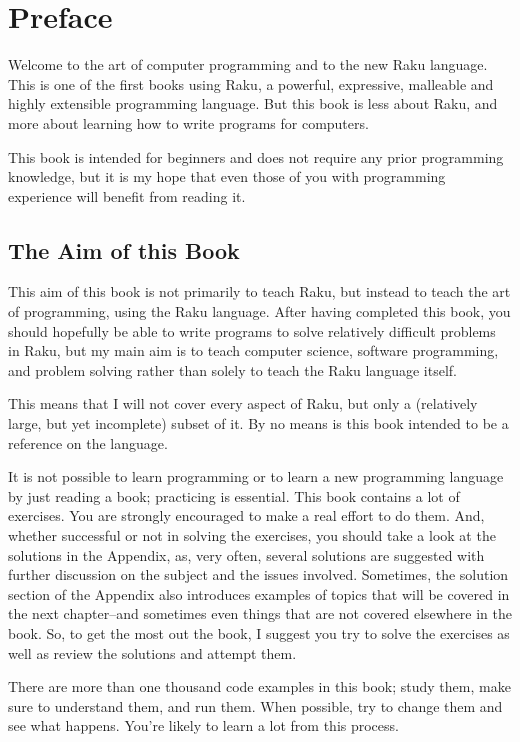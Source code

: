 
\chapter{Preface}

Welcome to the art of computer programming and to the 
new Raku language. This is one of the first books using Raku,
a powerful, expressive, malleable and highly extensible 
programming language. But this book is less 
about Raku, and more about learning 
how to write programs for computers. 

This book is intended for beginners and does not require 
any prior programming knowledge, but it is my hope 
that even those of you with programming experience will 
benefit from reading it.

\section*{The Aim of this Book}

This aim of this book is not primarily to teach Raku, 
but instead to teach the art 
of programming, using the Raku language. After having 
completed this book, you should hopefully be able 
to write programs to solve relatively difficult problems in 
Raku, but my main aim is to teach computer science, software 
programming, and problem solving rather than solely to teach 
the Raku language itself. 

This means that I will not cover every aspect of Raku, but 
only a (relatively large, but yet incomplete) subset of it. 
By no means is this book intended to be a reference on the 
language.

It is not possible to learn programming or to learn a new 
programming language by just reading a book; practicing 
is essential. This book contains a lot of exercises. You 
are strongly encouraged to make a real effort to do them. And, 
whether successful or not in solving the exercises, you 
should take a look at the solutions in the Appendix, 
as, very often, several solutions are suggested with further 
discussion on the subject and the issues involved. Sometimes, the solution 
section of the Appendix also introduces examples of topics 
that will be covered in the next chapter--and sometimes even 
things that are not covered elsewhere in the book. So, to get 
the most out the book, I suggest you try to solve the exercises 
as well as review the solutions and attempt them.

There are more than one thousand code examples in this book; 
study them, make sure to understand them, and run them. When 
possible, try to change them and see what happens. You're 
likely to learn a lot from this process.


